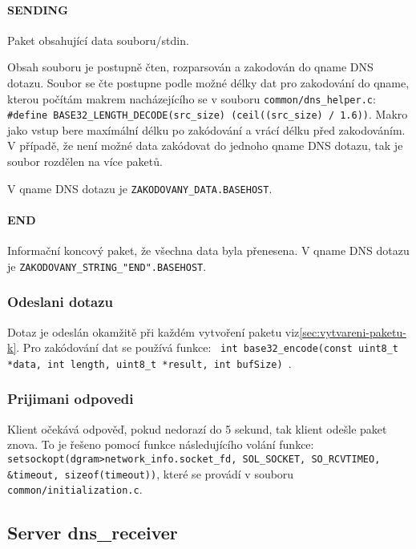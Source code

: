\paragraph{SENDING}
Paket obsahující data souboru/stdin.

Obsah souboru je postupně čten, rozparsován a zakodován do qname DNS dotazu.
Soubor se čte postupne podle možné délky dat pro
zakodování do qname, kterou počítám
makrem nacházejícího se v souboru \texttt{common/dns\_helper.c}:
\texttt{\#define BASE32\_LENGTH\_DECODE(src\_size) (ceil((src\_size) / 1.6))}.
Makro jako vstup bere maxímální délku po zakódování a vrácí délku před zakodováním.
V případě, že není možné data zakódovat do jednoho qname DNS dotazu,
tak je soubor rozdělen na více paketů.

V qname DNS dotazu je \texttt{ZAKODOVANY\_DATA.BASEHOST}.

\paragraph{END}

Informační koncový paket, že všechna data byla přenesena.
V qname DNS dotazu je \texttt{ZAKODOVANY\_STRING\_"END".BASEHOST}.

\subsubsection{Odeslani dotazu} \label{sec:odeslani-dotazu-k}
Dotaz je odeslán okamžitě při každém vytvoření paketu viz\ref{sec:vytvareni-paketu-k}.
Pro zakódování dat se používá funkce:
\texttt{ int base32\_encode(const uint8\_t *data, int length, uint8\_t *result, int bufSize) }\cite{encodingData}.

\subsubsection{Prijimani odpovedi}\label{sec:prijimani-odpovedi-k}
Klient očekává odpověď, pokud nedorazí do 5 sekund, tak klient
odešle paket znova.
To je řešeno pomocí funkce následujícího volání funkce:
\texttt{setsockopt(dgram\->network\_info.socket\_fd, SOL\_SOCKET, SO\_RCVTIMEO, \&timeout, sizeof(timeout))},
které se provádí v souboru \texttt{common/initialization.c}.



\subsection{Server \- dns\_receiver}

